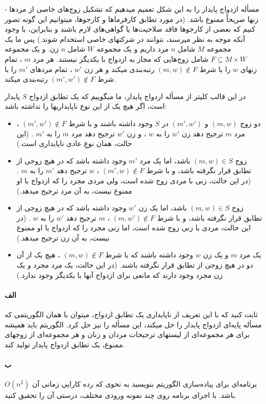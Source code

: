 \documentclass[]{article}
\begin{document}
مسأله ازدواج پایدار را به این شکل تعمیم میدهیم که تشکیل زوج‌های خاصی از مردها - زنها صریحاً ممنوع باشد.
(در مورد تطابق کارفرماها و کارجوها، میتوانیم این گونه تصور کنیم که بعضی از کارجوها فاقد صلاحیت‌ها یا گواهی‌های لازم باشند و بنابراین،
با وجود آنکه موجه به نظر میرسند، نتوانند در شرکتهای خاصی استخدام شوند.)
پس ما یک مجموعه $M$ شامل $n$ مرد داریم و یک مجموعه $W$ شامل $n$ زن.
و یک مجموعه $F \subseteq M \times W$ شامل زوج‌هایی که مجاز به ازدواج با یکدیگر نیستند.
هر مرد $m$ ، تمام زنهای $w$ را با شرط $(m, w) \not \in F$ رتبه‌بندی میکند و هر زن $w'$ ، تمام مردهای $m'$ را با شرط $(m', w') \not \in F$ رتبه‌بندی میکند.

در این قالب کلیتر از مسأله ازدواج پایدار، ما میگوییم که یک تطابق ازدواج $S$ پایدار است، اگر هیچ یک از این نوع ناپایداریها را نداشته باشد:
\begin{itemize}
    \item دو زوج $(m, w)$ و $(m', w')$ در $S$ وجود داشته باشند و با شرط $(m', w') \not \in F$ ،
    مرد $m$ ترجیح دهد زن $w'$ را به $w$ ، و زن $w'$ ترجیح دهد مرد $m$ را به $m'$ . (این حالت، همان نوعِ عادی ناپایداری است.)

    \item زوج $(m, w) \in S$ باشد، اما یک مرد $m'$ وجود داشته باشد که در هیچ زوجی از تطابق قرار نگرفته باشد، و با شرط $(m', w) \not \in F$ ،
    $w$ ترجیح دهد $m'$ را به $m$ .
    (در این حالت، زنی با مردی زوج شده است، ولی مردی مجرد را که ازدواج با او ممنوع نیست، به آن مرد ترجیح میدهد.)

    \item زوج $(m, w) \in S$ باشد، اما یک زن $w'$ وجود داشته باشد که در هیچ زوجی از تطابق قرار نگرفته باشد،
    و با شرط $(m, w') \not \in F$ ، $m$ ترجیح دهد $w'$ را به $w$ .
    (در این حالت، مردی با زنی زوج شده است، اما زنی مجرد را که ازدواج با او ممنوع نیست، به آن زن ترجیح میدهد.)

    \item یک مرد $m$ و یک زن $w$ وجود داشته باشند که با شرط $(m, w) \not \in F$ ،
    هیچ یک از آن دو در هیچ زوجی از تطابق قرار نگرفته باشند.
    (در این حالت، یک مرد مجرد و یک زن مجرد وجود دارند که مانعی برای ازدواج آنها با یکدیگر وجود ندارد.)
\end{itemize}

\paragraph*{الف}
ثابت کنید که با این تعریف از ناپایداری یک تطابق ازدواج، میتوان با همان الگوریتمی که مسأله پایه‌ای ازدواج پایدار را حل میکند، این مسأله را نیز حل کرد.
الگوریتم باید همیشه برای هر مجموعه‌ای از لیستهای ترجیحات مردان و زنان و هر مجموعه‌ای از زوجهای ممنوع، یک تطابق ازدواج پایدار تولید کند.

\paragraph*{ب}
برنامه‌ای برای پیاده‌سازی الگوریتم بنویسید به نحوی که رده کارایی زمانی آن $O(n^2)$ باشد.
با اجرای برنامه روی چند نمونه ورودی مختلف، درستی آن را تحقیق کنید.
\end{document}
